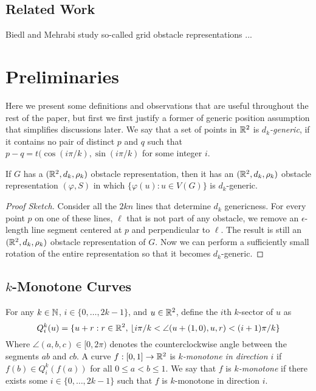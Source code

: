 \documentclass{patmorin}
\begin{document}
\subsection{Related Work}

Biedl and Mehrabi study so-called grid obstacle representations \cite{X}...


\section{Preliminaries}

Here we present some definitions and observations that are useful
throughout the rest of the paper, but first we first justify a former of
generic position assumption that simplifies discussions later.  We say
that a set of points in $\mathbb{R}^2$ is \emph{$d_k$-generic}, if it contains no
pair of distinct $p$ and $q$ such that $p-q= t(\cos(i\pi/k),\sin(i\pi/k)$
for some integer $i$.

\begin{obs}
  If $G$ has a $(\mathbb{R}^2,d_k,\rho_k)$ obstacle representation, then it
  has an $(\mathbb{R}^2,d_k,\rho_k)$ obstacle representation $(\varphi, S)$
  in which $\{\varphi(u):u\in V(G)\}$ is $d_k$-generic.
\end{obs}

\begin{proof}[Proof Sketch]
   Consider all the $2kn$ lines that determine $d_k$ genericness.
   For every point $p$ on one of these lines, $\ell$ that is not
   part of any obstacle, we remove an $\epsilon$-length line segment
   centered at $p$ and perpendicular to $\ell$. The result is still
   an $(\mathbb{R}^2,d_k,\rho_k)$ obstacle representation of $G$.  Now we can
   perform a sufficiently small rotation of the entire representation
   so that it becomes $d_k$-generic.
\end{proof}



\subsection{$k$-Monotone Curves}

For any $k\in\mathbb{N}$, $i\in\{0,\ldots,2k-1\}$, and $u\in\mathbb{R}^2$, define the
$i$th $k$-sector of $u$ as
\[
   Q^{k}_i(u) = 
     \{ u+r: r\in\mathbb{R}^2,\,\lfloor i\pi/k < \angle(u+(1,0),u,r) < (i+1)\pi/k \}
\]
Where $\angle (a,b,c)\in[0,2\pi)$ denotes the counterclockwise angle
between the segments $ab$ and $cb$.  A curve $f:[0,1]\to\mathbb{R}^2$ is
\emph{$k$-monotone in direction $i$} if $f(b)\in Q^k_i(f(a))$ for all
$0 \le a < b \le 1$.  We say that $f$ is \emph{$k$-monotone} if there
exists some $i\in\{0,\ldots,2k-1\}$ such that $f$ is $k$-monotone in
direction $i$.  
\end{document}
